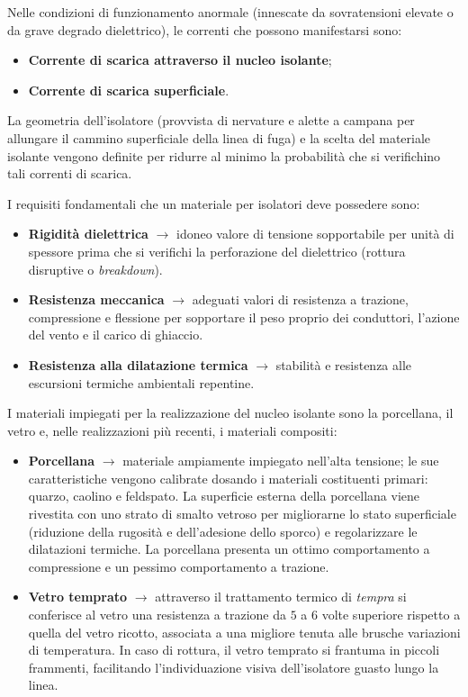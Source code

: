 Nelle condizioni di funzionamento anormale (innescate da sovratensioni elevate o da grave degrado dielettrico), le correnti che possono manifestarsi sono:
\begin{itemize}
    \item \textbf{Corrente di scarica attraverso il nucleo isolante};
    \item \textbf{Corrente di scarica superficiale}.
\end{itemize}
La geometria dell'isolatore (provvista di nervature e alette a campana per allungare il cammino superficiale della linea di fuga) e la scelta del materiale isolante vengono definite per ridurre al minimo la probabilità che si verifichino tali correnti di scarica.

I requisiti fondamentali che un materiale per isolatori deve possedere sono:
\begin{itemize}
    \item \textbf{Rigidità dielettrica} $\rightarrow$ idoneo valore di tensione sopportabile per unità di spessore prima che si verifichi la perforazione del dielettrico (rottura disruptive o \textit{breakdown}).
    \item \textbf{Resistenza meccanica} $\rightarrow$ adeguati valori di resistenza a trazione, compressione e flessione per sopportare il peso proprio dei conduttori, l'azione del vento e il carico di ghiaccio.
    \item \textbf{Resistenza alla dilatazione termica} $\rightarrow$ stabilità e resistenza alle escursioni termiche ambientali repentine.
\end{itemize}

I materiali impiegati per la realizzazione del nucleo isolante sono la porcellana, il vetro e, nelle realizzazioni più recenti, i materiali compositi:
\begin{itemize}
    \item \textbf{Porcellana} $\rightarrow$ materiale ampiamente impiegato nell'alta tensione; le sue caratteristiche vengono calibrate dosando i materiali costituenti primari: quarzo, caolino e feldspato. La superficie esterna della porcellana viene rivestita con uno strato di smalto vetroso per migliorarne lo stato superficiale (riduzione della rugosità e dell'adesione dello sporco) e regolarizzare le dilatazioni termiche. La porcellana presenta un ottimo comportamento a compressione e un pessimo comportamento a trazione.
    \item \textbf{Vetro temprato} $\rightarrow$ attraverso il trattamento termico di \textit{tempra} si conferisce al vetro una resistenza a trazione da $5$ a $6$ volte superiore rispetto a quella del vetro ricotto, associata a una migliore tenuta alle brusche variazioni di temperatura. In caso di rottura, il vetro temprato si frantuma in piccoli frammenti, facilitando l'individuazione visiva dell'isolatore guasto lungo la linea.
\end{itemize}

